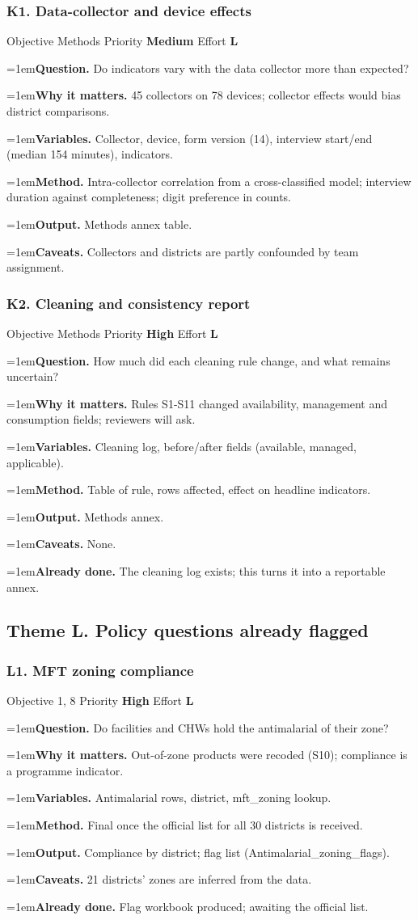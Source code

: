 \documentclass[10pt,a4paper]{article}
\newcommand{\field}[2]{\par\hangindent=1em\textbf{#1.} #2}
\begin{document}
\subsubsection*{K1. Data-collector and device effects}
{\footnotesize\color{gray} Objective Methods \textperiodcentered{} Priority \textbf{Medium} \textperiodcentered{} Effort \textbf{L}}
\field{Question}{Do indicators vary with the data collector more than expected?}
\field{Why it matters}{45 collectors on 78 devices; collector effects would bias district comparisons.}
\field{Variables}{Collector, device, form version (14), interview start/end (median 154 minutes), indicators.}
\field{Method}{Intra-collector correlation from a cross-classified model; interview duration against completeness; digit preference in counts.}
\field{Output}{Methods annex table.}
\field{Caveats}{Collectors and districts are partly confounded by team assignment.}
\subsubsection*{K2. Cleaning and consistency report}
{\footnotesize\color{gray} Objective Methods \textperiodcentered{} Priority \textbf{High} \textperiodcentered{} Effort \textbf{L}}
\field{Question}{How much did each cleaning rule change, and what remains uncertain?}
\field{Why it matters}{Rules S1-S11 changed availability, management and consumption fields; reviewers will ask.}
\field{Variables}{Cleaning log, before/after fields (available, managed, applicable).}
\field{Method}{Table of rule, rows affected, effect on headline indicators.}
\field{Output}{Methods annex.}
\field{Caveats}{None.}
\field{Already done}{The cleaning log exists; this turns it into a reportable annex.}
\subsection{Theme L. Policy questions already flagged}
\subsubsection*{L1. MFT zoning compliance}
{\footnotesize\color{gray} Objective 1, 8 \textperiodcentered{} Priority \textbf{High} \textperiodcentered{} Effort \textbf{L}}
\field{Question}{Do facilities and CHWs hold the antimalarial of their zone?}
\field{Why it matters}{Out-of-zone products were recoded (S10); compliance is a programme indicator.}
\field{Variables}{Antimalarial rows, district, mft\_zoning lookup.}
\field{Method}{Final once the official list for all 30 districts is received.}
\field{Output}{Compliance by district; flag list (Antimalarial\_zoning\_flags).}
\field{Caveats}{21 districts' zones are inferred from the data.}
\field{Already done}{Flag workbook produced; awaiting the official list.}
\end{document}
